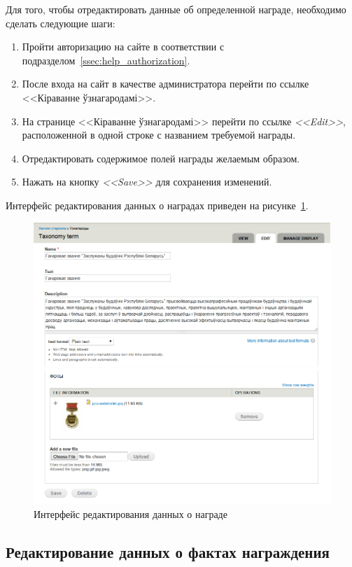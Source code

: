 Для того, чтобы отредактировать данные об определенной награде,
необходимо сделать следующие шаги:

\begin{enumerate}
\item Пройти авторизацию на сайте в соответствии с подразделом~\ref{ssec:help_authorization}.
\item После входа на сайт в качестве администратора
   перейти по ссылке <<Кіраванне ўзнагародамі>>.
\item На странице <<Кіраванне ўзнагародамі>> перейти по ссылке \textit{<<Edit>>},
  расположенной в одной строке с названием требуемой награды.
\item Отредактировать содержимое полей награды желаемым образом.
\item Нажать на кнопку \textit{<<Save>>} для сохранения изменений.
\end{enumerate}

Интерфейс редактирования данных о наградах приведен
на рисунке~\ref{fig:awards_edit_page}.

\begin{figure}[h]
  \centering
  \includegraphics[width=150mm]{pic/awards_edit_page.png}
  \caption{Интерфейс редактирования данных о награде}
  \label{fig:awards_edit_page}
\end{figure}


\subsection{Редактирование данных о фактах награждения}
\label{ssec:help_edit_awarded}

